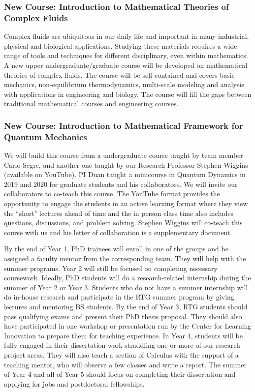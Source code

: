 \documentclass[11pt]{NSFamsart}
\begin{document}
\subsubsection*{New Course: Introduction to Mathematical Theories of Complex Fluids} 
Complex fluids are ubiquitous in our daily life and important in many industrial, physical and biological applications. Studying these materials requires a wide range 
of tools and techniques for different disciplinary, even within mathematics. A new upper undergraduate/graduate course will be developed on mathematical theories of complex fluids. The course will be self contained and covers basic mechanics, non-equilibrium thermodynamics, multi-scale modeling and analysis with applications in engineering and biology. The course will fill the gaps between traditional mathematical courses and engineering courses.
 
\subsubsection*{New Course: Introduction to Mathematical Framework for Quantum Mechanics} We will build this course from  a   undergraduate course   taught by team member Carlo Segre, and another one taught by our Research Professor Stephen Wiggins (available on YouTube). PI Duan   taught a minicourse in Quantum Dynamics \cite{Gutzwiller1990ChaosIC, Holland1993TheQT,Lindgren2019QuantumMC,Micha2006QuantumDW} in 2019 and 2020 for graduate students and his collaborators.  We will invite our collaborators to co-teach this course. 
The YouTube format provides the opportunity to engage the students in an active learning format where they view the “short" lectures ahead of time and the in person class time  also includes  questions, discussions, and problem solving. Stephen Wiggins will co-teach this course with us and his letter of collaboration is a supplementary document.

By the end of Year 1, PhD trainees will enroll in one of the groups and be assigned a faculty mentor from the corresponding team. They will   help with the summer programs.   Year 2
will still be focused on completing necessary coursework.
Ideally, PhD students will do a research-related internship during the summer of Year 2 or Year 3. Students who do not have
a summer internship will do in-house research and participate in the RTG summer program
by giving lectures and mentoring BS students. By the end of Year 3, RTG students
should pass qualifying exams and present their PhD thesis proposal. They should also have participated in one   workshop or presentation run by the Center for Learning Innovation to prepare them for teaching experience. In Year 4, students will be fully engaged in their dissertation work straddling one or more of our research project areas. They will also teach a section of Calculus with the support of a teaching
mentor, who will observe a few classes and write a report. The summer of Year 4 and all of Year 5 should focus on completing their dissertation and applying for jobs and postdoctoral fellowships.
\end{document}
